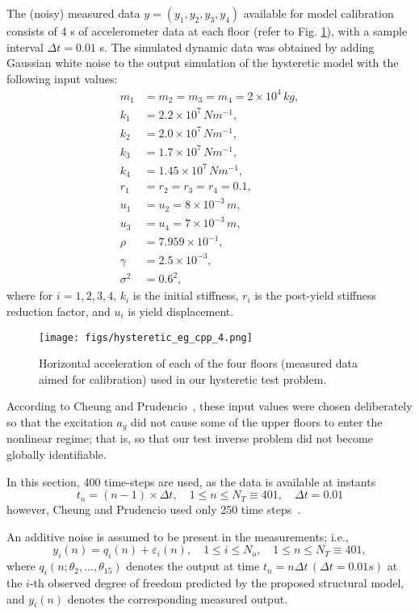 The (noisy) measured data $y = (y_1, y_2, y_3, y_4)$ available for model calibration consists of 4 s of accelerometer data at each floor (refer to Fig. \ref{hig:hist_acceleration_4_floors}), with a sample interval $\Delta t = 0.01$ s. The simulated dynamic data was obtained by adding Gaussian white noise to the output simulation of the hysteretic model with the following input values:
\begin{align*}
m_1 & = m_2 = m_3 = m_4 = 2\times 10^4 \,kg,\\
k_1 &=  2.2 \times 10^7 \,Nm^{-1},\\
k_2 &=  2.0 \times 10^7 \,Nm^{-1},\\
k_3 &=  1.7 \times 10^7 \,Nm^{-1},\\
k_4 &=  1.45 \times 10^7 \,Nm^{-1},\\
r_1 & = r_2 = r_3 = r_4 = 0.1,\\
u_1 & = u_2 = 8 \times 10^{-3} \,m, \\
u_3 & = u_4 = 7 \times 10^{-3} \,m, \\
\rho &= 7.959 \times 10^{-1}, \\
\gamma &= 2.5 \times 10^{-3},\\
\sigma^2 &= 0.6^2,
\end{align*}
where for $i=1,2,3,4$, $k_i$ is the initial stiffness, $r_i$ is the post-yield stiffness reduction factor, and $u_i$ is  yield displacement.


\begin{figure}[hptb]
\centering
\texttt{[image: figs/hysteretic\_eg\_cpp\_4.png]}
\vspace{-8pt}
\caption{Horizontal acceleration of each of the four floors (measured data aimed for calibration) used in our hysteretic test problem.}
\label{hig:hist_acceleration_4_floors}
\end{figure}

According to Cheung and Prudencio~\cite{CheungPrudencio2012}, these input values were chosen deliberately so that the excitation $a_g$ did not cause some of the upper floors to enter the nonlinear regime; that is, so that our test inverse problem did not become globally identifiable.

In this section, 400 time-steps are used, as the data is  available  at instants
$$t_n = (n - 1) \times \Delta t, \quad 1 \leq n \leq N_T \equiv 401, \quad \Delta t = 0.01$$
however, Cheung and Prudencio used only 250 time steps~\cite{CheungPrudencio2012}.

An additive noise is assumed to be present in the measurements; i.e.,
\begin{equation*}
y_i(n)=q_i(n)+\varepsilon_i(n), \quad 1 \leq i \leq N_o, \quad  1 \leq n \leq N_T \equiv 401,
\end{equation*}
where $q_i(n; \theta_2 ,...,\theta_{15})$ denotes the output at time $t_n= n\Delta t \, (\Delta t=0.01s)$ at the $i$-th observed degree of freedom predicted by the proposed structural model, and $y_i(n)$ denotes the corresponding
measured output.


